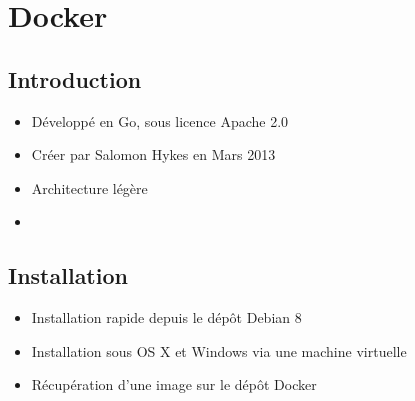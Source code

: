 \documentclass{beamer}
\begin{document}
    
    
    
    
    
    
    
    
    
    
    
    
    
    
    
    
    
    
    
    
    
    
    
    
    
    
    
    
    
    
    
    
    
    
    
    
    
    
    
    
    
    \section{Docker}
    \subsection{Introduction}
    \begin{frame}
       \begin{itemize}
          \item{Développé en Go, sous licence Apache 2.0}
          \item{Créer par Salomon Hykes en Mars 2013}
          \item{Architecture légère}
          \item{}
       \end{itemize}
    \end{frame}

    \subsection{Installation}
    \begin{frame}
       \begin{itemize}
          \item{Installation rapide depuis le dépôt Debian 8}
          \item{Installation sous OS X et Windows via une machine virtuelle}
          \item{Récupération d'une image sur le dépôt Docker}
       \end{itemize}
    \end{frame}
\end{document}
